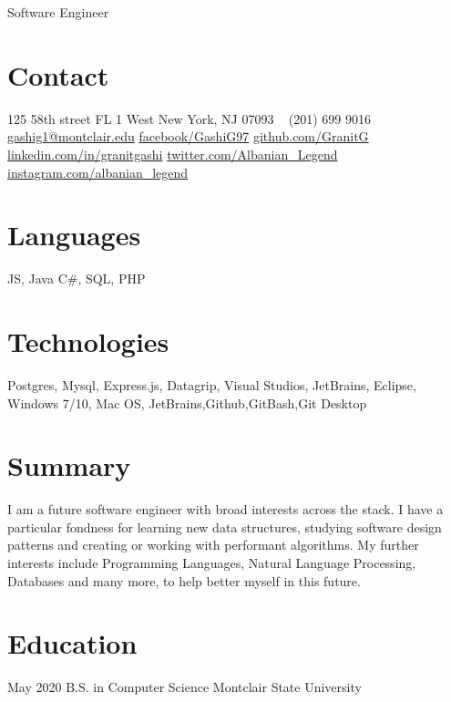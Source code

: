 \documentclass[]{friggeri-cv}
\begin{document}
       {Software Engineer}


\begin{aside} %
\section{\color{brown}Con\color{black}tact}
125 58th street FL 1
West New York, NJ 07093
~
(201) 699 9016
~
\href{mailto:gashig1@montclair.edu}{gashig1@montclair.edu}
\href{https://www.facebook.com/GashiG97}{facebook/GashiG97}
\href{https://github.com/GranitG}{github.com/GranitG}
\href{https://www.linkedin.com/in/granitgashi/}{linkedin.com/in/granitgashi}
\href{https://twitter.com/Albanian\_Legend}{twitter.com/Albanian\_Legend}
\href{https://www.instagram.com/albanian\_legend/}{instagram.com/albanian\_legend}
\section{\color{violet}Lang\color{black}uages}
{\large JS, Java}
{C\#, SQL, PHP}
\section{\color{olive}Tech\color{black}nologies}
{Postgres, Mysql, Express.js, Datagrip, Visual Studios, JetBrains, Eclipse, Windows 7/10, Mac OS, JetBrains,Github,GitBash,Git Desktop} 
\end{aside}

\section{Summary}

I am a future software engineer with broad interests across the stack. I have a particular fondness for learning new data structures, studying software design patterns and creating or working with performant algorithms. My further interests include Programming Languages, Natural Language Processing, Databases and many more, to help better myself in this future.

\section{Education}

\begin{entrylist}
\entry
{May 2020}
{B.S. {\normalfont in Computer Science}}
{Montclair State University}

\end{entrylist}
\end{document}
